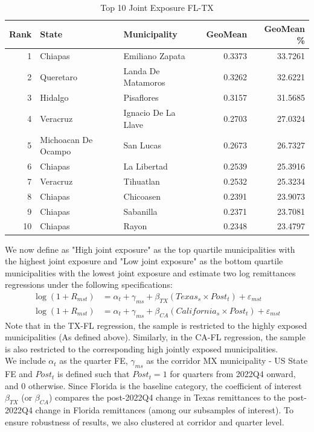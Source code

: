 \begin{table}[h]
\centering
\caption{Top 10 Joint Exposure FL-TX} %
\label{tab:joint_exposure_tx}         %
\begin{tabular}{rllrr}
\toprule
Rank & State & Municipality & GeoMean & GeoMean \% \\
\midrule
1 & Chiapas & Emiliano Zapata & 0.3373 & 33.7261 \\
2 & Queretaro & Landa De Matamoros & 0.3262 & 32.6221 \\
3 & Hidalgo & Pisaflores & 0.3157 & 31.5685 \\
4 & Veracruz & Ignacio De La Llave & 0.2703 & 27.0324 \\
5 & Michoacan De Ocampo & San Lucas & 0.2673 & 26.7327 \\
6 & Chiapas & La Libertad & 0.2539 & 25.3916 \\
7 & Veracruz & Tihuatlan & 0.2532 & 25.3234 \\
8 & Chiapas & Chicoasen & 0.2391 & 23.9073 \\
9 & Chiapas & Sabanilla & 0.2371 & 23.7081 \\
10 & Chiapas & Rayon & 0.2348 & 23.4797 \\
\bottomrule
\end{tabular}
\end{table}
We now define as "High joint exposure" as the top quartile municipalities with the highest joint exposure and "Low joint exposure" as the bottom quartile municipalities with the lowest joint exposure and estimate two log remittances regressions under the following specifications: 
\begin{align*}
\log(1 + R_{mst}) &= \alpha_t + \gamma_{ms} + \beta_{TX} (Texas_s \times Post_t) + \varepsilon_{mst} \\
\log(1 + R_{mst}) &= \alpha_t + \gamma_{ms} + \beta_{CA} (California_s \times Post_t) + \varepsilon_{mst}
\end{align*}
Note that in the TX-FL regression, the sample is restricted to the highly exposed municipalities (As defined above). Similarly, in the CA-FL regression, the sample is also restricted to the corresponding high jointly exposed municipalities.\\
We include $\alpha_t$ as the quarter FE, $\gamma_{ms}$ as the corridor MX municipality - US State FE and $Post_t$ is defined such that $Post_t = 1$ for quarters from 2022Q4 onward, and 0 otherwise. Since Florida is the baseline category, the coefficient of interest $\beta_{TX}$ (or $\beta_{CA}$) compares the post-2022Q4 change in Texas remittances to the post-2022Q4 change in Florida remittances (among our subsamples of interest). To ensure robustness of results, we also clustered at corridor and quarter level.\\
